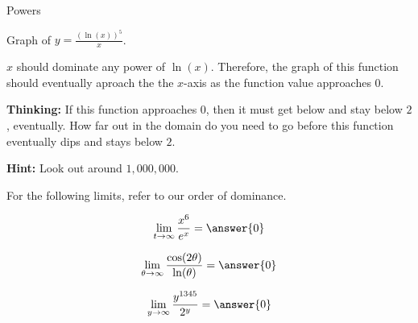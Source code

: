 \documentclass{ximera}
\begin{document}
\begin{example} Powers


Graph of $y = \frac{(\ln(x))^5}{x}$.

$x$ should dominate any power of $\ln(x)$.  Therefore, the graph of this function should eventually aproach the the $x$-axis as the function value approaches $0$. 


\textbf{Thinking:} If this function approaches $0$, then it must get below and stay below $2$, eventually. How far out in the domain do you need to go before this function eventually dips and stays below $2$.


\begin{center}
\end{center}




\textbf{Hint:} Look out around $1,000,000$.

\end{example}







For the following limits, refer to our order of dominance.

\begin{question}

\[
\lim\limits_{t \to \infty} \frac{x^6}{e^x} = \answer{0}
\]

\end{question}









\begin{question}

\[
\lim\limits_{\theta \to \infty} \frac{\cos(2 \theta)}{\ln(\theta)} = \answer{0}
\]

\end{question}









\begin{question}

\[
\lim\limits_{y \to \infty} \frac{y^{1345}}{2^y} = \answer{0}
\]

\end{question}
\end{document}

